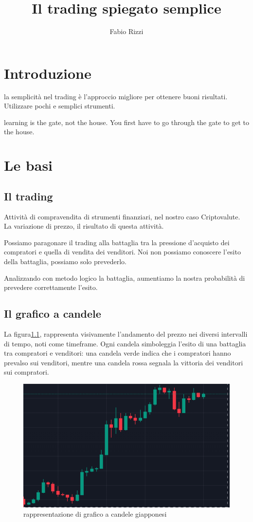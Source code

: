 \documentclass[10pt,a4paper,titlepage]{book}
\author{Fabio Rizzi}
\title{Il trading spiegato semplice}
\begin{document}
\maketitle
\tableofcontents%
\chapter*{Introduzione}
la semplicità nel trading è l'approccio migliore per ottenere buoni risultati.\\
Utilizzare pochi e semplici strumenti.

learning is the gate, not the house. You first have to go through
the gate to get to the house.
\newpage
\chapter{Le basi}
\section{Il trading} 
Attività di compravendita di strumenti finanziari, nel nostro caso Criptovalute. La variazione di prezzo, il risultato di questa attività.

Possiamo paragonare il trading alla battaglia tra la pressione d'acquisto dei compratori e quella di vendita dei venditori. Noi non possiamo conoscere l'esito della battaglia, possiamo solo prevederlo.

Analizzando con metodo logico la battaglia, aumentiamo la nostra probabilità di prevedere correttamente l'esito.

\section{Il grafico a candele} La figura\ref{graficocandele}, rappresenta visivamente l'andamento del prezzo nei diversi intervalli di tempo, noti come timeframe. Ogni candela simboleggia l'esito di una battaglia tra compratori e venditori: una candela verde indica che i compratori hanno prevalso sui venditori, mentre una candela rossa segnala la vittoria dei venditori sui compratori.

\begin{figure}[hbtp]
\centering
\includegraphics[scale=0.5]{Immagini/grafico-candele.png}
\caption{rappresentazione di grafico a candele giapponesi}
\label{graficocandele} %
\end{figure}
\end{document}

